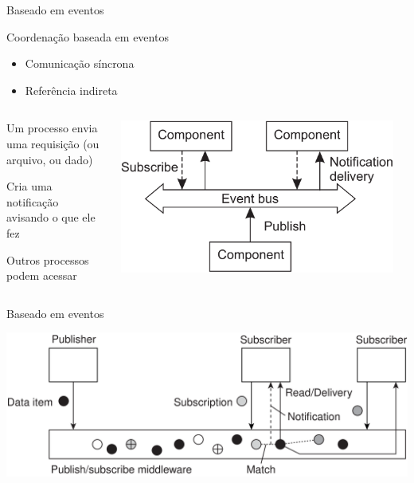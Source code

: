 \documentclass[compress]{beamer}
\begin{document}
\begin{frame}{Baseado em eventos}

Coordenação baseada em eventos
\begin{itemize}
    \item Comunicação síncrona
    \item Referência indireta
\end{itemize}

\vspace{0.5cm}

\begin{columns}[T]
    \begin{column}{.45\textwidth}
        Um processo envia uma requisição (ou arquivo, ou dado) 
        
        \vspace{0.5cm}
        
        Cria uma notificação avisando o que ele fez
        
        \vspace{0.5cm}
        
        Outros processos podem acessar
    \end{column}
    \begin{column}{.54\textwidth}
        \vspace{0.78cm}
        \centering\includegraphics[width=0.95\textwidth]{images/arquitetura_eventos.png}
    \end{column}
\end{columns}

\end{frame}

\begin{frame}{Baseado em eventos}
    
    \vspace{1cm}
    
    \centering\includegraphics[width=\textwidth]{images/subscribe.png}
    
\end{frame}
\end{document}
